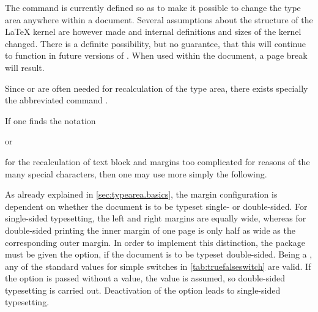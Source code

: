 \begin{Explain}
  The command  is currently defined so as to make it
  possible to change the type area anywhere within a
  document. Several assumptions about the structure of the {\LaTeX}
  kernel are however made and internal definitions and sizes of the
  kernel changed. There is a definite possibility, but no guarantee,
  that this will continue to function in future versions of
  \LaTeXe{}. When used within the document, a page break will result.
\end{Explain}

Since  or
 are often needed for
recalculation of the type area, there exists specially the
abbreviated command
.

\begin{Example}
  If one finds the notation
\begin{lstcode}
\end{lstcode}
  or
\begin{lstcode}
\end{lstcode}
  for the recalculation of text block and margins too complicated for
  reasons of the many special characters, then one may use more simply
  the following.
\begin{lstcode}
  \recalctypearea
\end{lstcode}
\end{Example}%
\EndIndexGroup


\begin{Declaration}
\end{Declaration}%
As already explained in \autoref{sec:typearea.basics}, the margin
configuration is dependent on whether the document is to be typeset
single- or double-sided. For single-sided typesetting, the left and
right margins are equally wide, whereas for double-sided printing the
inner margin of one page is only half as wide as the corresponding
outer margin. In order to implement this distinction, the
 package must be given the  option,
if the document is to be typeset double-sided. Being a ,
any of the standard values for simple switches in
\autoref{tab:truefalseswitch} are valid. If the option is passed
without a value, the value  is assumed, so double-sided
typesetting is carried out. Deactivation of the option leads to
single-sided typesetting.

